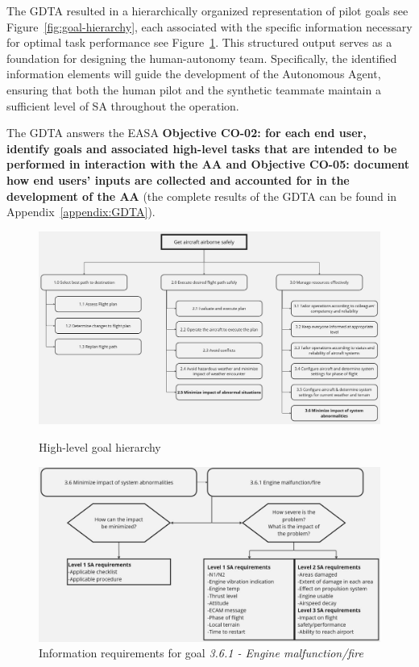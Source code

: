 \documentclass[12pt,a4paper]{article} %
\begin{document}
	The GDTA resulted in a hierarchically organized representation of pilot goals see Figure~\ref{fig:goal-hierarchy}, each associated with the specific information necessary for optimal task performance see Figure~\ref{fig:info_req}. This structured output serves as a foundation for designing the human-autonomy team. Specifically, the identified information elements will guide the development of the Autonomous Agent, ensuring that both the human pilot and the synthetic teammate maintain a sufficient level of SA throughout the operation.
	
	The GDTA answers the EASA \textbf{Objective CO-02: for each end user, identify goals and associated high-level tasks that are intended to be performed in interaction with the AA and Objective CO-05: document how end users' inputs are collected and accounted for in the development of the AA} (the complete results of the GDTA can be found in Appendix~\ref{appendix:GDTA}).

	\begin{figure}[H]
		\centering
		\begin{minipage}[b]{1\textwidth}
			\centering
			\includegraphics[width=1\textwidth]{./images/gdta_goal_hierarchy.jpg}
			\caption{High-level goal hierarchy}
			\label{fig:goal-hierarchy}
		\end{minipage}
		\begin{minipage}[b]{1\textwidth}
			\centering
			\includegraphics[width=1\textwidth]{images/goal_and_info_req.jpg}
			\caption{Information requirements for goal \textit{3.6.1 - Engine malfunction/fire}}
			\label{fig:info_req}
		\end{minipage}
	\end{figure}
\end{document}
